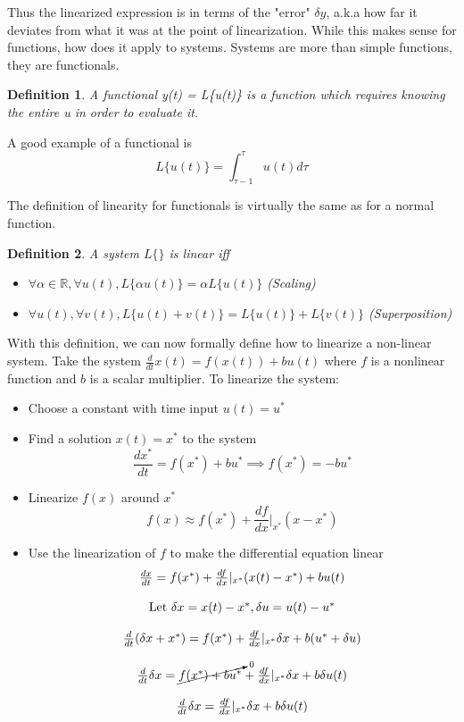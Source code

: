 \documentclass{article}
\newtheorem{definition}{Definition}
\begin{document}
Thus the linearized expression is in terms of the "error" $\delta y$, a.k.a how far it deviates from what it was at the point of linearization.
While this makes sense for functions, how does it apply to systems. Systems are more than simple functions, they are functionals.
\begin{definition}
    A functional y(t) = L\{u(t)\} is a function which requires knowing the entire u in order to evaluate it.
\end{definition}
A good example of a functional is
$$ L\{u(t)\}=\int_{\tau - 1}^{\tau}{u(t)d\tau}$$

The definition of linearity for functionals is virtually the same as for a normal function.
\begin{definition}
    A system $L\{\}$ is linear iff
    \begin{itemize}
        \item $\forall \alpha\in \mathbb{R}, \forall u(t), L\{\alpha u(t)\} = \alpha L\{u(t)\}$ (Scaling)
        \item $\forall u(t), \forall v(t), L\{u(t) + v(t)\} = L\{u(t)\}+L\{v(t)\}$ (Superposition)
    \end{itemize}
\end{definition}
With this definition, we can now formally define how to linearize a non-linear system.
Take the system $\frac{d}{dt}x(t) = f(x(t))+bu(t)$ where $f$ is a nonlinear function and $b$ is a scalar multiplier.
To linearize the system:
\begin{itemize}
    \item[1.] Choose a constant with time input $u(t) = u^*$
    \item[2.] Find a solution $x(t)=x^*$ to the system
            $$\frac{dx^*}{dt}=f(x^*)+bu^* \implies f(x^*)=-bu^*$$
    \item[3.] Linearize $f(x)$ around $x^*$
            $$f(x) \approx f(x^*)+\frac{df}{dx}|_{x^*} (x-x^*)$$
    \item[4.] Use the linearization of $f$ to make the differential equation linear
            \[
                \begin{array}{c}
                    \frac{dx}{dt} = f(x^*)+\frac{df}{dx}|_{x^*} (x(t)-x^*)+bu(t)\\\\
                    \text{Let }\delta x = x(t)-x^*, \delta u = u(t) - u^*\\\\
                    \frac{d}{dt}(\delta x +x^*) = f(x^*)+\frac{df}{dx}|_{x^*} \delta x + b (u^*+\delta u)\\\\
                    \frac{d}{dt}\delta x = \cancelto{0}{f(x^*)+bu^*} + \frac{df}{dx}|_{x^*} \delta x + b \delta u(t)\\\\
                    \frac{d}{dt}\delta x =  \frac{df}{dx}|_{x^*} \delta x + b \delta u(t)
                \end{array}
            \] 
\end{itemize}
\end{document}
